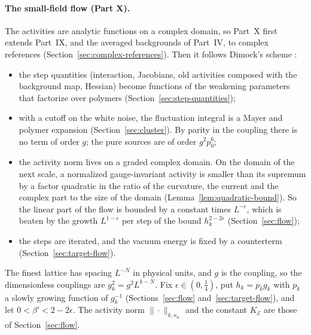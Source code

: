 \paragraph{The small-field flow (Part X).} The activities are analytic functions on a complex domain, so Part~X first extends Part~IX, and the averaged backgrounds of Part~IV, to complex references (Section~\ref{sec:complex-references}). Then it follows Dimock's scheme \cite{DimockI}:
\begin{itemize}
\item the step quantities (interaction, Jacobians, old activities composed with the background map, Hessian) become functions of the weakening parameters that factorize over polymers (Section~\ref{sec:step-quantities});
\item with a cutoff on the white noise, the fluctuation integral is a Mayer and polymer expansion (Section~\ref{sec:cluster}). By parity in the coupling there is no term of order $g$; the pure sources are of order $g^2p_0^6$;
\item the activity norm lives on a graded complex domain. On the domain of the next scale, a normalized gauge-invariant activity is smaller than its supremum by a factor quadratic in the ratio of the curvature, the current and the complex part to the size of the domain (Lemma~\ref{lem:quadratic-bound}). So the linear part of the flow is bounded by a constant times $L^{-\epsilon}$, which is beaten by the growth $L^{1-\epsilon}$ per step of the bound $h_k^{2-2\epsilon}$ (Section~\ref{sec:flow});
\item the steps are iterated, and the vacuum energy is fixed by a counterterm (Section~\ref{sec:target-flow}).
\end{itemize}
The finest lattice has spacing $L^{-N}$ in physical units, and $g$ is the coupling, so the dimensionless couplings are $g_k^2=g^2L^{k-N}$. Fix $\epsilon\in(0,\frac14)$, put $h_k=p_kg_k$ with $p_k$ a slowly growing function of $g_k^{-1}$ (Sections~\ref{sec:flow} and~\ref{sec:target-flow}), and let $0<\beta'<2-2\epsilon$. The activity norm $\|\cdot\|_{k,\kappa_n}$ and the constant $K_{\mathcal E}$ are those of Section~\ref{sec:flow}.

